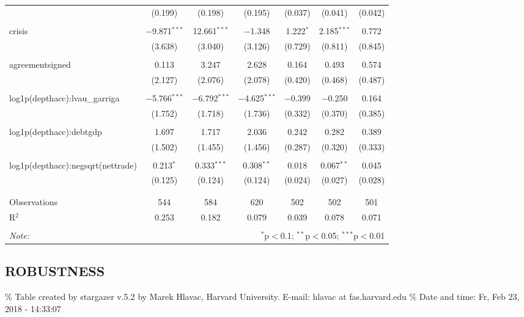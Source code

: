 \documentclass[]{article}
\begin{document}
\begin{table}[!htbp]
\begin{tabular}{@{\extracolsep{5pt}}lcccccc}
  & (0.199) & (0.198) & (0.195) & (0.037) & (0.041) & (0.042) \\ 
  & & & & & & \\ 
 crisis & $-$9.871$^{***}$ & 12.661$^{***}$ & $-$1.348 & 1.222$^{*}$ & 2.185$^{***}$ & 0.772 \\ 
  & (3.638) & (3.040) & (3.126) & (0.729) & (0.811) & (0.845) \\ 
  & & & & & & \\ 
 agreementsigned & 0.113 & 3.247 & 2.628 & 0.164 & 0.493 & 0.574 \\ 
  & (2.127) & (2.076) & (2.078) & (0.420) & (0.468) & (0.487) \\ 
  & & & & & & \\ 
 log1p(depthacc):lvau\_garriga & $-$5.766$^{***}$ & $-$6.792$^{***}$ & $-$4.625$^{***}$ & $-$0.399 & $-$0.250 & 0.164 \\ 
  & (1.752) & (1.718) & (1.736) & (0.332) & (0.370) & (0.385) \\ 
  & & & & & & \\ 
 log1p(depthacc):debtgdp & 1.697 & 1.717 & 2.036 & 0.242 & 0.282 & 0.389 \\ 
  & (1.502) & (1.455) & (1.456) & (0.287) & (0.320) & (0.333) \\ 
  & & & & & & \\ 
 log1p(depthacc):negsqrt(nettrade) & 0.213$^{*}$ & 0.333$^{***}$ & 0.308$^{**}$ & 0.018 & 0.067$^{**}$ & 0.045 \\ 
  & (0.125) & (0.124) & (0.124) & (0.024) & (0.027) & (0.028) \\ 
  & & & & & & \\ 
\hline \\[-1.8ex] 
Observations & 544 & 584 & 620 & 502 & 502 & 501 \\ 
R$^{2}$ & 0.253 & 0.182 & 0.079 & 0.039 & 0.078 & 0.071 \\ 
\hline 
\hline \\[-1.8ex] 
\textit{Note:}  & \multicolumn{6}{r}{$^{*}$p$<$0.1; $^{**}$p$<$0.05; $^{***}$p$<$0.01} \\ 
\end{tabular} 
\end{table}

\subsection{ROBUSTNESS}\label{robustness}

\% Table created by stargazer v.5.2 by Marek Hlavac, Harvard University.
E-mail: hlavac at fas.harvard.edu \% Date and time: Fr, Feb 23, 2018 -
14:33:07
\end{document}
